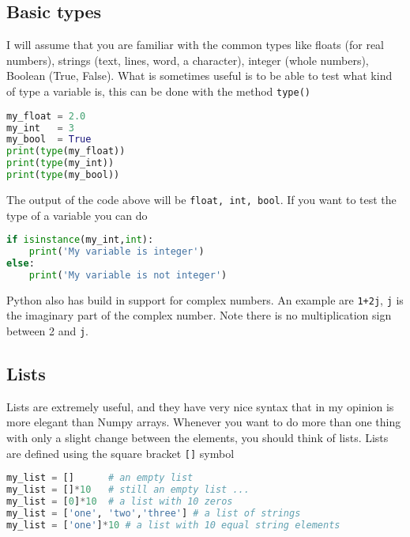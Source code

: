 \documentclass[graybox,sectrefs,envcountresetchap,open=right,final]{svmonodo}
\begin{document}
\subsection{Basic types}
I will assume that you are familiar with the common types like floats (for real numbers), strings (text, lines, word, a character), integer (whole numbers), Boolean (True, False). What is sometimes useful is to be able to test what kind of type a variable is, this can be done with the method \texttt{type()}







\begin{lstlisting}[language=python,style=blue1bar]
my_float = 2.0 
my_int   = 3
my_bool  = True
print(type(my_float))
print(type(my_int))
print(type(my_bool))

\end{lstlisting}

The output of the code above will be \texttt{float, int, bool}. If you want to test the type  of a variable you can do





\begin{lstlisting}[language=python,style=blue1bar]
if isinstance(my_int,int):
    print('My variable is integer')
else:
    print('My variable is not integer')

\end{lstlisting}

Python also has build in support for complex numbers. An example are \texttt{1+2j}, \texttt{j} is the imaginary part of the complex number. Note there is no multiplication sign between 2 and \texttt{j}.

\subsection{Lists}

 
Lists are extremely useful, and they have very nice syntax that in my opinion is more elegant than Numpy arrays. Whenever you want to do more than one thing with only a slight change between the elements, you should think of lists. Lists are defined using the square bracket \texttt{[]} symbol






\begin{lstlisting}[language=python,style=blue1bar]
my_list = []      # an empty list
my_list = []*10   # still an empty list ...
my_list = [0]*10  # a list with 10 zeros
my_list = ['one', 'two','three'] # a list of strings
my_list = ['one']*10 # a list with 10 equal string elements 

\end{lstlisting}
\end{document}

